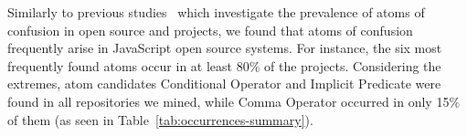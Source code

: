 Similarly to previous studies~\cite{DBLP:conf/msr/GopsteinZFC18,DBLP:journals/ese/MedeirosLAAKRG19} which investigate
the prevalence of atoms of confusion in open source \clang and \cpplang projects, we found that atoms of confusion
frequently arise in JavaScript open source systems. For instance, the six most frequently found atoms
occur in at least 80\% of the projects. Considering the extremes, atom candidates Conditional Operator and Implicit Predicate were found in all repositories we mined,
while Comma Operator occurred in only 15\% of them (as seen in Table~\ref{tab:occurrences-summary}).





